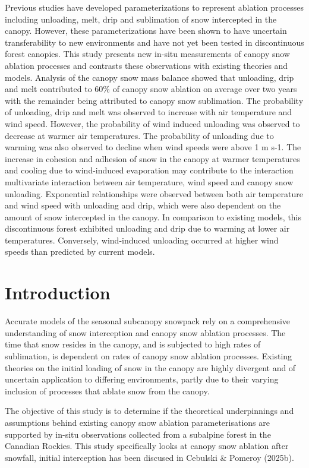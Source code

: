 \documentclass[
  letterpaper,
  DIV=11,
  numbers=noendperiod]{scrartcl}
\begin{document}
Previous studies have developed parameterizations to represent ablation
processes including unloading, melt, drip and sublimation of snow
intercepted in the canopy. However, these parameterizations have been
shown to have uncertain transferability to new environments and have not
yet been tested in discontinuous forest canopies. This study presents
new in-situ measurements of canopy snow ablation processes and contrasts
these observations with existing theories and models. Analysis of the
canopy snow mass balance showed that unloading, drip and melt
contributed to 60\% of canopy snow ablation on average over two years
with the remainder being attributed to canopy snow sublimation. The
probability of unloading, drip and melt was observed to increase with
air temperature and wind speed. However, the probability of wind induced
unloading was observed to decrease at warmer air temperatures. The
probability of unloading due to warming was also observed to decline
when wind speeds were above 1 m s-1. The increase in cohesion and
adhesion of snow in the canopy at warmer temperatures and cooling due to
wind-induced evaporation may contribute to the interaction multivariate
interaction between air temperature, wind speed and canopy snow
unloading. Exponential relationships were observed between both air
temperature and wind speed with unloading and drip, which were also
dependent on the amount of snow intercepted in the canopy. In comparison
to existing models, this discontinuous forest exhibited unloading and
drip due to warming at lower air temperatures. Conversely, wind-induced
unloading occurred at higher wind speeds than predicted by current
models.

\section{Introduction}\label{introduction}

Accurate models of the seasonal subcanopy snowpack rely on a
comprehensive understanding of snow interception and canopy snow
ablation processes. The time that snow resides in the canopy, and is
subjected to high rates of sublimation, is dependent on rates of canopy
snow ablation processes. Existing theories on the initial loading of
snow in the canopy are highly divergent and of uncertain application to
differing environments, partly due to their varying inclusion of
processes that ablate snow from the canopy.

The objective of this study is to determine if the theoretical
underpinnings and assumptions behind existing canopy snow ablation
parameterisations are supported by in-situ observations collected from a
subalpine forest in the Canadian Rockies. This study specifically looks
at canopy snow ablation after snowfall, initial interception has been
discused in Cebulski \& Pomeroy (2025b).
\end{document}
